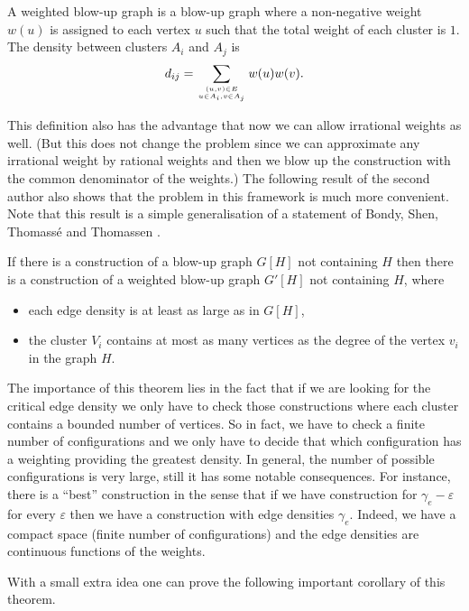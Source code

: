 \documentclass[12pt,a4paper]{amsart}
\numberwithin{equation}{section}
\begin{document}
\begin{defn} A weighted blow-up graph is a blow-up graph where a non-negative
  weight $w(u)$ is assigned to each vertex $u$ such that the total weight of
  each cluster is $1$. The density  between clusters $A_i$ and $A_j$ is
$$d_{ij}=\sum_{(u,v)\in E \atop u\in A_i,v\in A_j}w(u)w(v).$$
\end{defn}

This definition also has the advantage that now we can allow irrational
weights as well. (But this does not change the problem since we can
approximate any irrational weight by rational weights and then we blow up the
construction with the common denominator of the weights.) The following
result of the second author  \cite{nagy1}  also shows that the problem in this
framework is much more convenient. Note that this result is a simple
generalisation of a statement of Bondy, Shen, Thomass\'e and Thomassen
\cite{bond}.  

\begin{theorem} {\rm \cite{nagy1}} \label{ZolTh1} If
  there is a construction of a 
  blow-up graph $G[H]$ not containing $H$ then there is a construction of a
  weighted blow-up graph $G'[H]$ not containing $H$, where
\begin{itemize} 
\item each edge density is at least as large as in $G[H]$,
\item the cluster $V_i$ contains at most as many vertices as the degree of the
  vertex $v_i$ in the graph $H$.
\end{itemize}
\end{theorem}

The importance of this theorem lies in the fact that  if we are looking for
the critical edge density we only have to check 
those constructions where each cluster contains a bounded number of
vertices. So in fact, we have to check a finite number of configurations and
we only have to decide that which configuration has a weighting providing the
greatest density. In general, the number of possible configurations is very
large, still it has some notable consequences. For instance, there is a ``best''
construction in the sense that if we have construction for
${\gamma_e-\varepsilon}$ for every $\varepsilon$ then we have a construction
with edge densities $\gamma_e$. Indeed, we have a compact space (finite number
of configurations) and the edge densities are continuous functions of the
weights.    

With a small  extra idea one can prove the following  important corollary of
this theorem. 
\end{document}
